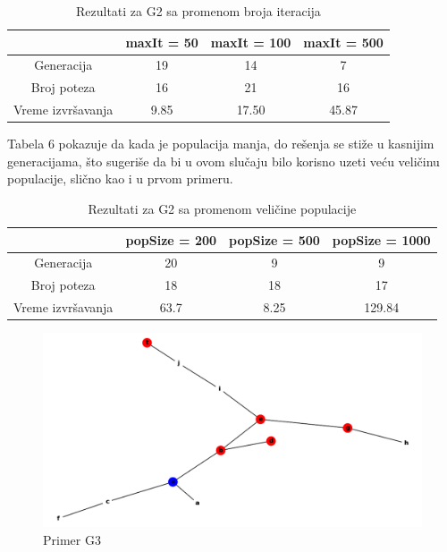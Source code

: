 \documentclass[12pt]{article}
\begin{document}
	\begin {table}[H]
\begin{center}
	\caption {Rezultati za G2 sa promenom broja iteracija} \label{tab:title} 
	\begin{tabular}{|| c|c c c||} 	
		\hline
		& maxIt = 50 & maxIt = 100 & maxIt = 500 \\ 
		\hline\hline
		Generacija & 19 & 14 & 7  \\ 
		\hline
		Broj poteza & 16 & 21 & 16\\
		\hline
		Vreme izvršavanja & 9.85 & 17.50 & 45.87 \\
		\hline
	\end{tabular}
\end{center}
\end{table}

	\par Tabela 6 pokazuje da kada je populacija manja, do rešenja se stiže u kasnijim generacijama, što sugeriše da bi u ovom slučaju bilo korisno uzeti veću veličinu populacije, slično kao i u prvom primeru. 

\begin {table}[H]
\begin{center}
\caption {Rezultati za G2 sa promenom veličine populacije} \label{tab:title} 
\begin{tabular}{|| c|c c c||} 	
	\hline
	& popSize = 200 & popSize = 500 & popSize = 1000 \\ 
	\hline\hline
	Generacija & 20 & 9 & 9 \\ 
	\hline
	Broj poteza & 18 & 18 & 17 \\
	\hline
	Vreme izvršavanja & 63.7 & 8.25 & 129.84 \\
	\hline
\end{tabular}
\end{center}
\end{table}

\begin{figure}[H]
	\begin{center}
		\includegraphics[scale=0.42]{g3.png}
	\end{center}
	\caption{Primer G3}
	\label{fig:slika4}
\end{figure}
\end{document}
